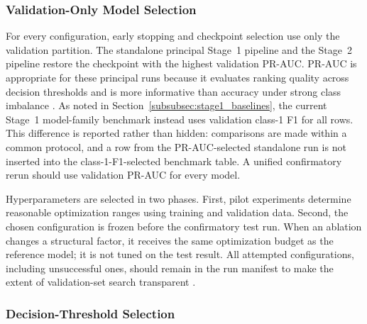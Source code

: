 \subsubsection{Validation-Only Model Selection}
\label{subsubsec:validation_only_selection}

For every configuration, early stopping and checkpoint selection use only the
validation partition. The standalone principal Stage~1 pipeline and the
Stage~2 pipeline restore the checkpoint with the highest validation PR-AUC.
PR-AUC is appropriate for these principal runs because it evaluates ranking
quality across decision thresholds and is more informative than accuracy under
strong class imbalance \cite{SaitoRehmsmeier2015}. As noted in
Section~\ref{subsubsec:stage1_baselines}, the current Stage~1 model-family
benchmark instead uses validation class-1 F1 for all rows. This difference is
reported rather than hidden: comparisons are made within a common protocol,
and a row from the PR-AUC-selected standalone run is not inserted into the
class-1-F1-selected benchmark table. A unified confirmatory rerun should use
validation PR-AUC for every model.

Hyperparameters are selected in two phases. First, pilot experiments determine
reasonable optimization ranges using training and validation data. Second,
the chosen configuration is frozen before the confirmatory test run. When an
ablation changes a structural factor, it receives the same optimization budget
as the reference model; it is not tuned on the test result. All attempted
configurations, including unsuccessful ones, should remain in the run manifest
to make the extent of validation-set search transparent
\cite{Pineau2021Reproducibility,Bouthillier2021Variance}.

\subsubsection{Decision-Threshold Selection}
\label{subsubsec:experimental_thresholding}

